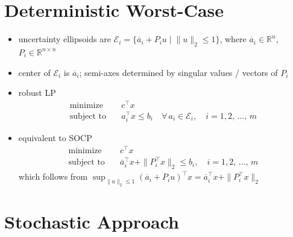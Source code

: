 \documentclass[11pt]{extarticle}
\newcommand{\ds}{\displaystyle}
\theoremstyle{definition}
\begin{document}
\newpage

\section*{Deterministic Worst-Case}

\begin{itemize}
  \item uncertainty ellipsoids are $\ds\mathcal{E}_i = \{\overline{a}_i + P_i u\;|\;\|u\|_2 \leqslant 1\}$, where $\overline{a}_i\in\mathbb{R}^n$, $P_i\in\mathbb{R}^{n\times n}$
  \item center of $\ds\mathcal{E}_i$ is $\overline{a}_i$; semi-axes determined by singular values / vectors of $P_i$
  \item robust LP
    \begin{align*}
      \text{minimize}\quad & c^\top x \\
      \text{subject to}\quad & a_i^\top x \leqslant b_i\quad\forall\,a_i\in\mathcal{E}_i, \quad i = 1, 2,\,\ldots,\,m 
    \end{align*}
  \item equivalent to SOCP
    \begin{align*}
      \text{minimize}\quad & c^\top x \\
      \text{subject to}\quad & \overline{a}_i^\top x + \|P_i^\top x\|_2 \leqslant b_i, \quad i = 1, 2,\,\ldots,\,m 
    \end{align*}
    which follows from $\ds\sup_{\|u\|_2\leqslant 1}(\overline{a}_i + P_i u)^\top x = \overline{a}_i^\top x + \|P_i^\top x\|_2$
\end{itemize}

\newpage

\section*{Stochastic Approach}
\end{document}
